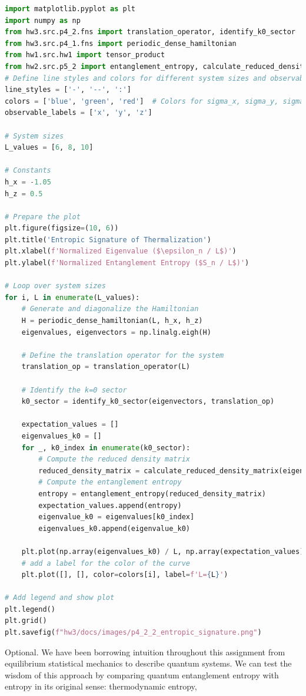\documentclass[12pt]{article}
\begin{document}
\begin{lstlisting}[language=Python]
import matplotlib.pyplot as plt
import numpy as np
from hw3.src.p4_2.fns import translation_operator, identify_k0_sector
from hw3.src.p4_1.fns import periodic_dense_hamiltonian
from hw1.src.hw1 import tensor_product
from hw2.src.p5_2 import entanglement_entropy, calculate_reduced_density_matrix
# Define line styles and colors for different system sizes and observables
line_styles = ['-', '--', ':']
colors = ['blue', 'green', 'red']  # Colors for sigma_x, sigma_y, sigma_z
observable_labels = ['x', 'y', 'z']

# System sizes
L_values = [6, 8, 10]

# Constants
h_x = -1.05
h_z = 0.5

# Prepare the plot
plt.figure(figsize=(10, 6))
plt.title('Entropic Signature of Thermalization')
plt.xlabel(f'Normalized Eigenvalue ($\epsilon_n / L$)')
plt.ylabel(f'Normalized Entanglement Entropy ($S_n / L$)')

# Loop over system sizes
for i, L in enumerate(L_values):
    # Generate and diagonalize the Hamiltonian
    H = periodic_dense_hamiltonian(L, h_x, h_z)
    eigenvalues, eigenvectors = np.linalg.eigh(H)

    # Define the translation operator for the system
    translation_op = translation_operator(L)

    # Identify the k=0 sector
    k0_sector = identify_k0_sector(eigenvectors, translation_op)

    expectation_values = []
    eigenvalues_k0 = []
    for _, k0_index in enumerate(k0_sector):
        # Compute the reduced density matrix
        reduced_density_matrix = calculate_reduced_density_matrix(eigenvectors[:, k0_index], L, L // 2)
        # Compute the entanglement entropy
        entropy = entanglement_entropy(reduced_density_matrix)
        expectation_values.append(entropy)
        eigenvalue_k0 = eigenvalues[k0_index]
        eigenvalues_k0.append(eigenvalue_k0)
        
    plt.plot(np.array(eigenvalues_k0) / L, np.array(expectation_values) / L, color=colors[i])
    # add a label for the color of the curve
    plt.plot([], [], color=colors[i], label=f'L={L}')

# Add legend and show plot
plt.legend()
plt.grid()
plt.savefig(f"hw3/docs/images/p4_2_2_entropic_signature.png")

\end{lstlisting}
\newpage

Optional. We have been borrowing intuition throughout this assignment from equilibrium statistical mechanics to describe quantum systems. We can test the wisdom of this approach by comparing quantum entanglement entropy with entropy in its original sense: thermodynamic entropy,
\end{document}
